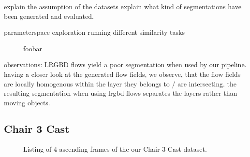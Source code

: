 explain the assumption of the datasets
explain what kind of segmentations have been generated and evaluated.







parameterspace exploration
running different similarity tasks




\begin{figure}[H]
\begin{center}

\end{center}
\caption[Issue with LRGBD Flows]{foobar}
\label{fig:issues_lrgbd_flows}
\end{figure}

observations:
LRGBD flows yield a poor segmentation when used by our pipeline.
having a closer look at the generated flow fields, we observe, that the flow fields are locally homogenous within the layer they belongs to / are intersecting.
the resulting segmentation when using lrgbd flows separates the layers rather than moving objects.



\subsection{Chair 3 Cast}

\begin{figure}[H]
\begin{center}
\end{center}
\caption[Chair 3 Cast Dataset]{Listing of 4 ascending frames of the our Chair 3 Cast dataset.}
\label{fig:chair_3_cast_dataset}
\end{figure}

